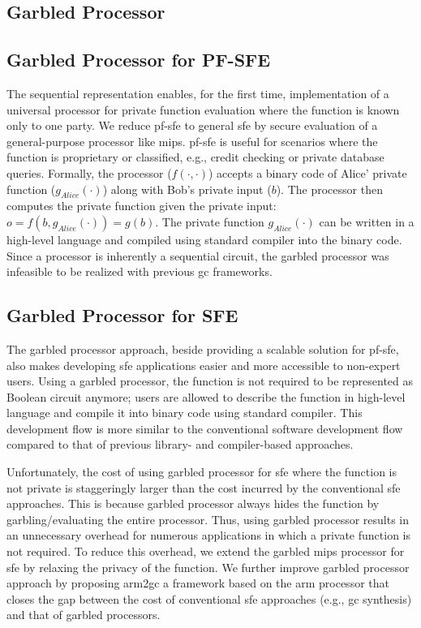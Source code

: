 \subsection{Garbled Processor}
\subsection{Garbled Processor for PF-SFE}
The sequential representation enables, for the first time, implementation of a universal processor for private function evaluation where the function is known only to one party.
We reduce \acrfull{pf-sfe} to general \acrshort{sfe} by secure evaluation of a general-purpose processor like \gls{mips}.
\acrshort{pf-sfe} is useful for scenarios where the function is proprietary or classified, e.g., credit checking or private database queries.
Formally, the processor ($f(\cdot,\cdot)$) accepts a binary code of Alice' private function ($g_{Alice}(\cdot)$) along with Bob's private input ($b$).
The processor then computes the private function given the private input: $o = f(b, g_{Alice}(\cdot)) = g(b)$.
The private function $g_{Alice}(\cdot)$ can be written in a high-level language and compiled using standard compiler into the binary code.
Since a processor is inherently a sequential circuit, the garbled processor was infeasible to be realized with previous \acrshort{gc} frameworks.

\subsection{Garbled Processor for SFE}
The garbled processor approach, beside providing a scalable solution for \acrshort{pf-sfe}, also makes developing \acrshort{sfe} applications easier and more accessible to non-expert users.
Using a garbled processor, the function is not required to be represented as Boolean circuit anymore; users are allowed to describe the function in high-level language and compile it into binary code using standard compiler.
This development flow is more similar to the conventional software development flow compared to that of previous library- and compiler-based approaches.

Unfortunately, the cost of using garbled processor for \acrshort{sfe} where the function is not private is staggeringly larger than the cost incurred by the conventional \acrshort{sfe} approaches.
This is because garbled processor always hides the function by garbling/evaluating the entire processor.
Thus, using garbled processor results in an unnecessary overhead for numerous applications in which a private function is not required.
To reduce this overhead, we extend the garbled \gls{mips} processor for \acrshort{sfe} by relaxing the privacy of the function.
We further improve garbled processor approach by proposing \gls{arm2gc} a framework based on the \gls{arm} processor that closes the gap between the cost of conventional \acrshort{sfe} approaches (e.g., \acrshort{gc} synthesis) and that of garbled processors.

